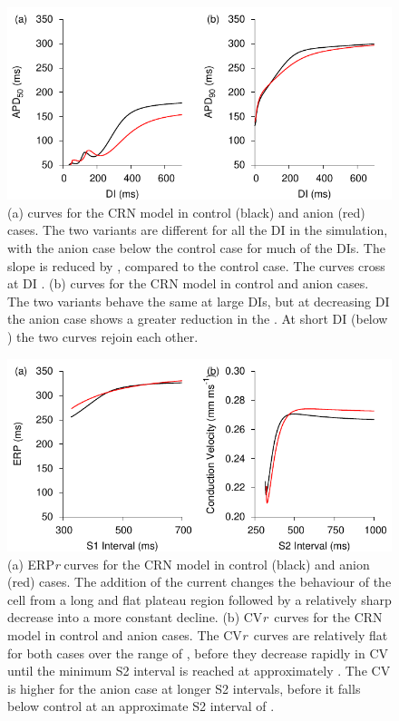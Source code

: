 \begin{figure}
\begin{center}
\includegraphics{figures/toolkit/anion/figures/02_APDR}
\end{center}
\caption[Anion Current APD Restitution]{
\label{fig:tookit:anion:apdr}
(a)
\apdr[50] curves for the CRN model in control (black) and anion (red) cases.
The two variants are different for all the DI in the simulation,
with the anion case below the control case for much of the DIs.
The slope is reduced by , compared to
the control case.  The curves cross at DI .
(b)
\apdr curves for the CRN model in control and anion cases.
The two variants behave the same at large DIs, but at decreasing DI the
anion case shows a greater reduction in the \apd.
At short DI (below ) the two curves rejoin each other.
}
\end{figure}
\begin{figure}
\begin{center}
\includegraphics{figures/toolkit/anion/figures/03_ERPR}
\end{center}
\caption[Anion Current ERPr and CVr] {
\label{fig:toolkit:anion:erpr}
(a)
ERP\emph{r} curves for the CRN model in control (black) and anion
(red) cases.
The addition of the  current changes the behaviour of the cell from a long
and flat plateau region followed by a relatively sharp decrease into a more
constant decline.
(b)
CV\emph{r}\ curves for the CRN model in control and anion cases.
 The CV\emph{r}\ curves are relatively flat for both cases over the range of
, before they decrease rapidly in CV until the minimum
S2 interval is reached at approximately .
The CV is higher for the anion case at longer S2 intervals, before it
falls below control at an approximate S2 interval of .
}
\end{figure}

